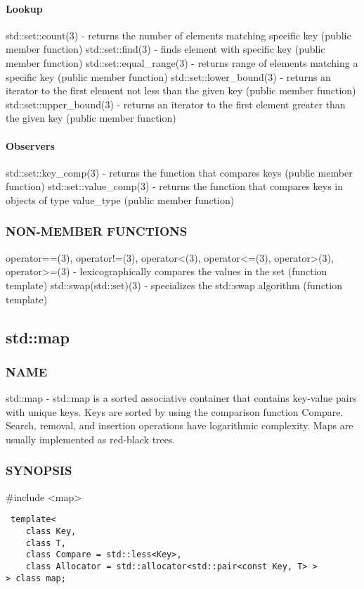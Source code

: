 \paragraph{Lookup}
std::set::count(3) - returns the number of elements matching specific key   (public member function)
std::set::find(3) - finds element with specific key  (public member function)
std::set::equal\_range(3) - returns range of elements matching a specific key  (public member function)
std::set::lower\_bound(3) - returns an iterator to the first element not less than the given key  (public member function)
std::set::upper\_bound(3) - returns an iterator to the first element greater than the given key  (public member function)
\paragraph{Observers}
std::set::key\_comp(3) - returns the function that compares keys  (public member function)
std::set::value\_comp(3) - returns the function that compares keys in objects of type value\_type  (public member function)

\subsubsection{NON-MEMBER FUNCTIONS}
operator==(3), operator!=(3), operator<(3), operator<=(3), operator>(3), operator>=(3) - lexicographically compares the values in the set   (function template)
std::swap(std::set)(3) - specializes the std::swap algorithm   (function template)


\subsection{std::map}

\subsubsection{NAME}
std::map - std::map is a sorted associative container that contains key-value pairs with unique keys. Keys are sorted by using the comparison function Compare.  Search, removal, and insertion operations have logarithmic complexity. Maps are usually implemented as red-black trees.

\subsubsection{SYNOPSIS}
\#include <map>

\begin{lstlisting}
 template<
    class Key,
    class T,
    class Compare = std::less<Key>,
    class Allocator = std::allocator<std::pair<const Key, T> >
> class map;
\end{lstlisting}

